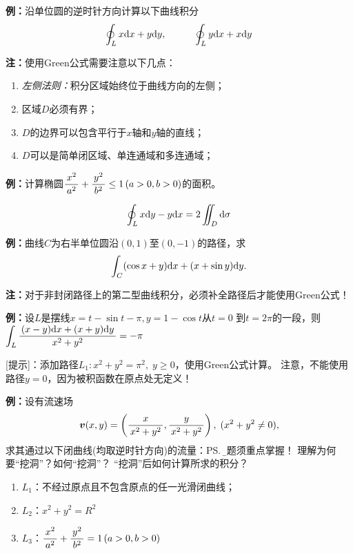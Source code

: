 {\bf 例：}沿单位圆的逆时针方向计算以下曲线积分
$$\oint_Lx\mathrm{d} x+y\mathrm{d} y,\hspace{3em}\oint_Ly\mathrm{d} x+x\mathrm{d} y$$

{\bf 注：}使用Green公式需要注意以下几点：
\begin{enumerate}[(1)]
  \setlength{\itemindent}{1cm}
  \item {\it 左侧法则：}积分区域始终位于曲线方向的左侧；
  \item 区域$D$必须有界；
  \item $D$的边界可以包含平行于$x$轴和$y$轴的直线；
  \item $D$可以是简单闭区域、单连通域和多连通域；
\end{enumerate}

{\bf 例：}计算椭圆$\displaystyle\frac{\,{x^2}\,}{\,{a^2}\,}+\displaystyle\frac{\,{y^2}\,}{\,{b^2}\,}\leq 1\,(a>0,b>0)$的面积。

$$\oint_L x\mathrm{d} y-y\mathrm{d} x=2\iint_D\mathrm{d}\sigma$$

{\bf 例：}曲线$C$为右半单位圆沿$(0,1)$至$(0,-1)$的路径，求
$$\int_C(\cos x+y)\mathrm{d} x+(x+\sin y)\mathrm{d} y.$$

{\bf 注：}对于非封闭路径上的第二型曲线积分，必须补全路径后才能使用Green公式！

{\bf 例：}设$L$是摆线$x=t-\sin t-\pi,y=1-\cos t$从$t=0$
到$t=2\pi$的一段，则$\displaystyle\int_L\displaystyle\frac{\,{(x-y)\mathrm{d} x+(x+y)\mathrm{d} y}\,}{\,{x^2+y^2}\,}=-\pi$

[提示]：添加路径$L_1:x^2+y^2=\pi^2,\;y\geq 0$，使用Green公式计算。
注意，不能使用路径$y=0$，因为被积函数在原点处无定义！

{\bf 例：}设有流速场
$$\bm{v}(x,y)=\left(\displaystyle\frac{\,{x}\,}{\,{x^2+y^2}\,},
\displaystyle\frac{\,{y}\,}{\,{x^2+y^2}\,}\right),\;(x^2+y^2\ne 0),$$
求其通过以下闭曲线(均取逆时针方向)的流量：\ps{{\b 本题须重点掌握！}
理解为何要“挖洞”？如何“挖洞”？
“挖洞”后如何计算所求的积分？}
\begin{enumerate}[(1)]
  \setlength{\itemindent}{1cm}
  \item $L_1$：不经过原点且不包含原点的任一光滑闭曲线；
  \item $L_2$：$x^2+y^2=R^2$
  \item $L_3$：$\displaystyle\frac{\,{x^2}\,}{\,{a^2}\,}+\displaystyle\frac{\,{y^2}\,}{\,{b^2}\,}=1\,(a>0,b>0)$
\end{enumerate}

